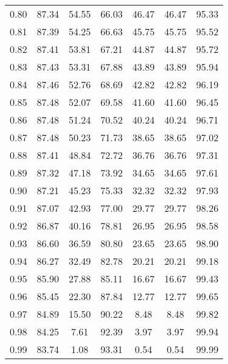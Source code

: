\begin{tabular}{|c|c|c|c|c|c|c|}
      0.80 &     87.34 &     54.55 &      66.03 &   46.47 &      46.47 &         95.33 \\
      0.81 &     87.39 &     54.25 &      66.63 &   45.75 &      45.75 &         95.52 \\
      0.82 &     87.41 &     53.81 &      67.21 &   44.87 &      44.87 &         95.72 \\
      0.83 &     87.43 &     53.31 &      67.88 &   43.89 &      43.89 &         95.94 \\
      0.84 &     87.46 &     52.76 &      68.69 &   42.82 &      42.82 &         96.19 \\
      0.85 &     87.48 &     52.07 &      69.58 &   41.60 &      41.60 &         96.45 \\
      0.86 &     87.48 &     51.24 &      70.52 &   40.24 &      40.24 &         96.71 \\
      0.87 &     87.48 &     50.23 &      71.73 &   38.65 &      38.65 &         97.02 \\
      0.88 &     87.41 &     48.84 &      72.72 &   36.76 &      36.76 &         97.31 \\
      0.89 &     87.32 &     47.18 &      73.92 &   34.65 &      34.65 &         97.61 \\
      0.90 &     87.21 &     45.23 &      75.33 &   32.32 &      32.32 &         97.93 \\
      0.91 &     87.07 &     42.93 &      77.00 &   29.77 &      29.77 &         98.26 \\
      0.92 &     86.87 &     40.16 &      78.81 &   26.95 &      26.95 &         98.58 \\
      0.93 &     86.60 &     36.59 &      80.80 &   23.65 &      23.65 &         98.90 \\
      0.94 &     86.27 &     32.49 &      82.78 &   20.21 &      20.21 &         99.18 \\
      0.95 &     85.90 &     27.88 &      85.11 &   16.67 &      16.67 &         99.43 \\
      0.96 &     85.45 &     22.30 &      87.84 &   12.77 &      12.77 &         99.65 \\
      0.97 &     84.89 &     15.50 &      90.22 &    8.48 &       8.48 &         99.82 \\
      0.98 &     84.25 &      7.61 &      92.39 &    3.97 &       3.97 &         99.94 \\
      0.99 &     83.74 &      1.08 &      93.31 &    0.54 &       0.54 &         99.99 \\
\bottomrule
\end{tabular}
